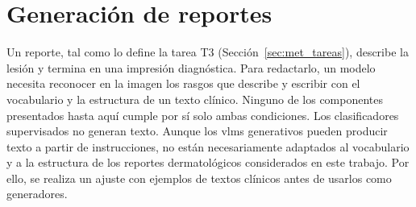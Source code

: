 \section{Generación de reportes}
\label{sec:met_generacion}


Un reporte, tal como lo define la tarea T3 (Sección~\ref{sec:met_tareas}), describe la lesión y termina en una
impresión diagnóstica. Para redactarlo, un modelo necesita reconocer en la imagen los rasgos que describe y escribir
con el vocabulario y la estructura de un texto clínico. Ninguno de los componentes presentados hasta aquí cumple por sí
solo ambas condiciones. Los clasificadores supervisados no generan texto. Aunque los \glspl{vlm} generativos pueden producir texto a partir de instrucciones, no están necesariamente adaptados al vocabulario y a la estructura de los reportes dermatológicos considerados en este trabajo. Por ello, se realiza un ajuste con ejemplos de textos clínicos antes de usarlos como generadores.

